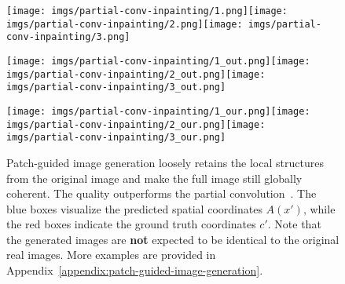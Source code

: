 \documentclass{article}
\begin{document}
        \begin{figure}[t]
            \centering
            \parbox[b]{.075\linewidth}{}\texttt{[image: imgs/partial-conv-inpainting/1.png]}\hspace{0.2em}\texttt{[image: imgs/partial-conv-inpainting/2.png]}\hspace{0.2em}\texttt{[image: imgs/partial-conv-inpainting/3.png]}
            
            \vspace{0.1em}
            
            \parbox[b]{.075\linewidth}{}\texttt{[image: imgs/partial-conv-inpainting/1\_out.png]}\hspace{0.2em}\texttt{[image: imgs/partial-conv-inpainting/2\_out.png]}\hspace{0.2em}\texttt{[image: imgs/partial-conv-inpainting/3\_out.png]}
            
            \vspace{0.1em}
            
            \parbox[b]{.075\linewidth}{}\texttt{[image: imgs/partial-conv-inpainting/1\_our.png]}\hspace{0.2em}\texttt{[image: imgs/partial-conv-inpainting/2\_our.png]}\hspace{0.2em}\texttt{[image: imgs/partial-conv-inpainting/3\_our.png]}
            
            \caption{Patch-guided image generation loosely retains the local structures from the original image and make the full image still globally coherent. The quality outperforms the partial convolution~\cite{partial-conv}. The {\color{blue} blue} boxes visualize the predicted spatial coordinates $A(x')$, while the {\color{red} red} boxes indicate the ground truth coordinates $c'$. Note that the generated images are \textbf{not} expected to be identical to the original real images. More examples are provided in Appendix~\ref{appendix:patch-guided-image-generation}.}
            \label{fig:patch-guided-image-generation}
\end{figure}
        
\end{document}
